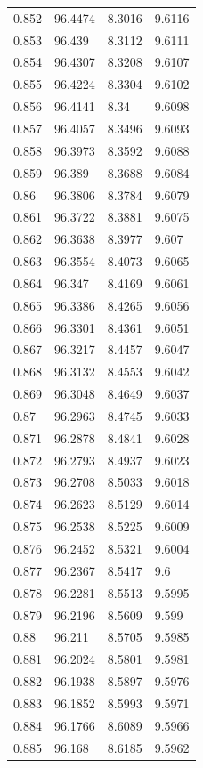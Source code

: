 \begin{tabular}{llll}
0.852 & 96.4474 & 8.3016 & 9.6116 \\
0.853 & 96.439 & 8.3112 & 9.6111 \\
0.854 & 96.4307 & 8.3208 & 9.6107 \\
0.855 & 96.4224 & 8.3304 & 9.6102 \\
0.856 & 96.4141 & 8.34 & 9.6098 \\
0.857 & 96.4057 & 8.3496 & 9.6093 \\
0.858 & 96.3973 & 8.3592 & 9.6088 \\
0.859 & 96.389 & 8.3688 & 9.6084 \\
0.86 & 96.3806 & 8.3784 & 9.6079 \\
0.861 & 96.3722 & 8.3881 & 9.6075 \\
0.862 & 96.3638 & 8.3977 & 9.607 \\
0.863 & 96.3554 & 8.4073 & 9.6065 \\
0.864 & 96.347 & 8.4169 & 9.6061 \\
0.865 & 96.3386 & 8.4265 & 9.6056 \\
0.866 & 96.3301 & 8.4361 & 9.6051 \\
0.867 & 96.3217 & 8.4457 & 9.6047 \\
0.868 & 96.3132 & 8.4553 & 9.6042 \\
0.869 & 96.3048 & 8.4649 & 9.6037 \\
0.87 & 96.2963 & 8.4745 & 9.6033 \\
0.871 & 96.2878 & 8.4841 & 9.6028 \\
0.872 & 96.2793 & 8.4937 & 9.6023 \\
0.873 & 96.2708 & 8.5033 & 9.6018 \\
0.874 & 96.2623 & 8.5129 & 9.6014 \\
0.875 & 96.2538 & 8.5225 & 9.6009 \\
0.876 & 96.2452 & 8.5321 & 9.6004 \\
0.877 & 96.2367 & 8.5417 & 9.6 \\
0.878 & 96.2281 & 8.5513 & 9.5995 \\
0.879 & 96.2196 & 8.5609 & 9.599 \\
0.88 & 96.211 & 8.5705 & 9.5985 \\
0.881 & 96.2024 & 8.5801 & 9.5981 \\
0.882 & 96.1938 & 8.5897 & 9.5976 \\
0.883 & 96.1852 & 8.5993 & 9.5971 \\
0.884 & 96.1766 & 8.6089 & 9.5966 \\
0.885 & 96.168 & 8.6185 & 9.5962 \\

\end{tabular}
